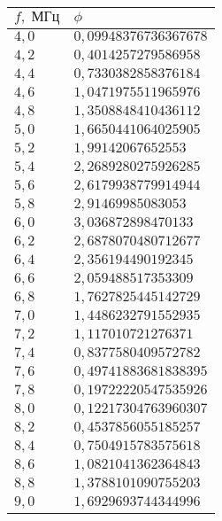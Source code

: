 \begin{tabular}{|l|l|}
\hline
$f,\;\text{МГц}$ & $\phi$\\\hline
$4{,}0$ & $0{,}09948376736367678$\\\hline
$4{,}2$ & $0{,}4014257279586958$\\\hline
$4{,}4$ & $0{,}7330382858376184$\\\hline
$4{,}6$ & $1{,}0471975511965976$\\\hline
$4{,}8$ & $1{,}3508848410436112$\\\hline
$5{,}0$ & $1{,}6650441064025905$\\\hline
$5{,}2$ & $1{,}99142067652553$\\\hline
$5{,}4$ & $2{,}2689280275926285$\\\hline
$5{,}6$ & $2{,}6179938779914944$\\\hline
$5{,}8$ & $2{,}91469985083053$\\\hline
$6{,}0$ & $3{,}036872898470133$\\\hline
$6{,}2$ & $2{,}6878070480712677$\\\hline
$6{,}4$ & $2{,}356194490192345$\\\hline
$6{,}6$ & $2{,}059488517353309$\\\hline
$6{,}8$ & $1{,}7627825445142729$\\\hline
$7{,}0$ & $1{,}4486232791552935$\\\hline
$7{,}2$ & $1{,}117010721276371$\\\hline
$7{,}4$ & $0{,}8377580409572782$\\\hline
$7{,}6$ & $0{,}49741883681838395$\\\hline
$7{,}8$ & $0{,}19722220547535926$\\\hline
$8{,}0$ & $0{,}12217304763960307$\\\hline
$8{,}2$ & $0{,}4537856055185257$\\\hline
$8{,}4$ & $0{,}7504915783575618$\\\hline
$8{,}6$ & $1{,}0821041362364843$\\\hline
$8{,}8$ & $1{,}3788101090755203$\\\hline
$9{,}0$ & $1{,}6929693744344996$\\\hline
\end{tabular}
